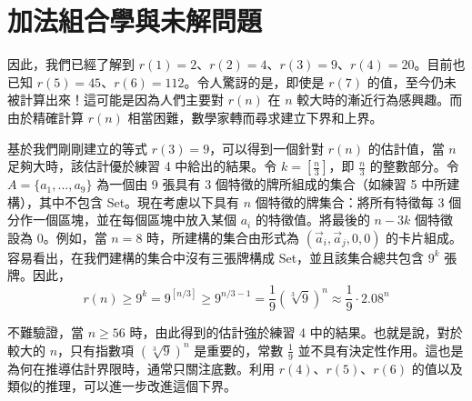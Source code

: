 \documentclass[12pt, a4paper]{article}
\begin{document}
\begin{center}
\end{center}

\section*{加法組合學與未解問題}

因此，我們已經了解到 $r(1)=2$、$r(2)=4$、$r(3)=9$、$r(4)=20$。目前也已知 $r(5)=45$、$r(6)=112$。令人驚訝的是，即使是 $r(7)$ 的值，至今仍未被計算出來！這可能是因為人們主要對 $r(n)$ 在 $n$ 較大時的漸近行為感興趣。而由於精確計算 $r(n)$ 相當困難，數學家轉而尋求建立下界和上界。

基於我們剛剛建立的等式 $r(3)=9$，可以得到一個針對 $r(n)$ 的估計值，當 $n$ 足夠大時，該估計優於練習 4 中給出的結果。令 $k=[\frac{n}{3}]$，即 $\frac{n}{3}$ 的整數部分。令 $A=\{a_{1},...,a_{9}\}$ 為一個由 9 張具有 3 個特徵的牌所組成的集合（如練習 5 中所建構），其中不包含 Set。現在考慮以下具有 $n$ 個特徵的牌集合：將所有特徵每 3 個分作一個區塊，並在每個區塊中放入某個 $a_{i}$ 的特徵值。將最後的 $n-3k$ 個特徵設為 0。例如，當 $n=8$ 時，所建構的集合由形式為 $(\vec{a}_{i},\vec{a}_{j},0,0)$ 的卡片組成。容易看出，在我們建構的集合中沒有三張牌構成 Set，並且該集合總共包含 $9^{k}$ 張牌。因此，
$$r(n)\ge9^{k}=9^{[n/3]}\ge9^{n/3-1}=\frac{1}{9}(\sqrt[3]{9})^{n}\approx\frac{1}{9}\cdot2.08^{n}$$

不難驗證，當 $n\ge56$ 時，由此得到的估計強於練習 4 中的結果。也就是說，對於較大的 $n$，只有指數項 $(\sqrt[3]{9})^{n}$ 是重要的，常數 $\frac{1}{9}$ 並不具有決定性作用。這也是為何在推導估計界限時，通常只關注底數。利用 $r(4)$、$r(5)$、$r(6)$ 的值以及類似的推理，可以進一步改進這個下界。
\end{document}

